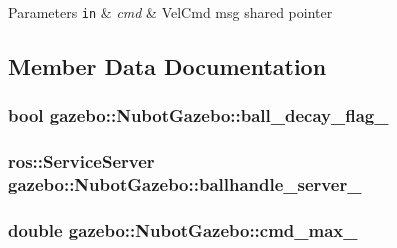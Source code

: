 \begin{DoxyParams}[1]{Parameters}
\mbox{\tt in}  & {\em cmd} & Vel\-Cmd msg shared pointer \\
\hline
\end{DoxyParams}


\subsection{Member Data Documentation}
\hypertarget{classgazebo_1_1NubotGazebo_a51c8eaa9e931b22700f6c000e413bfa2}{
\subsubsection[{ball\-\_\-decay\-\_\-flag\-\_\-}]{\setlength{\rightskip}{0pt plus 5cm}bool gazebo\-::\-Nubot\-Gazebo\-::ball\-\_\-decay\-\_\-flag\-\_\-\hspace{0.3cm}{\ttfamily [private]}}}\label{classgazebo_1_1NubotGazebo_a51c8eaa9e931b22700f6c000e413bfa2}
\hypertarget{classgazebo_1_1NubotGazebo_af8abc682c8dc7cad7d29d131901aec05}{
\subsubsection[{ballhandle\-\_\-server\-\_\-}]{\setlength{\rightskip}{0pt plus 5cm}ros\-::\-Service\-Server gazebo\-::\-Nubot\-Gazebo\-::ballhandle\-\_\-server\-\_\-\hspace{0.3cm}{\ttfamily [private]}}}\label{classgazebo_1_1NubotGazebo_af8abc682c8dc7cad7d29d131901aec05}
\hypertarget{classgazebo_1_1NubotGazebo_a6b6ab10ac24ec1483797885f5d1b9110}{
\subsubsection[{cmd\-\_\-max\-\_\-}]{\setlength{\rightskip}{0pt plus 5cm}double gazebo\-::\-Nubot\-Gazebo\-::cmd\-\_\-max\-\_\-\hspace{0.3cm}{\ttfamily [private]}}}\label{classgazebo_1_1NubotGazebo_a6b6ab10ac24ec1483797885f5d1b9110}
